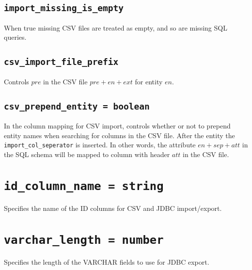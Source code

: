 \documentclass[10pt]{book}
\begin{document}
\subsection{{\tt import\_missing\_is\_empty}}

When true missing CSV files are treated as empty, and so are missing SQL queries.

\subsection{{\tt csv\_import\_file\_prefix}}

Controls $pre$ in the CSV file $pre + en + ext$ for entity $en$.

\subsection{{\tt csv\_prepend\_entity = boolean}}

In the column mapping for CSV import, controls whether or not to prepend entity names when searching for columns in the CSV file.   After the entity the {\tt import\_col\_seperator} is inserted.  In other words, the attribute $en + sep + att$ in the SQL schema will be mapped to column with header $att$ in the CSV file.

%

%
%
%
\section{{\tt id\_column\_name = string}}
Specifies the name of the ID columns for CSV and JDBC import/export.

\section{{\tt varchar\_length = number}}
Specifies the length of the VARCHAR fields to use for JDBC export.
\end{document}
